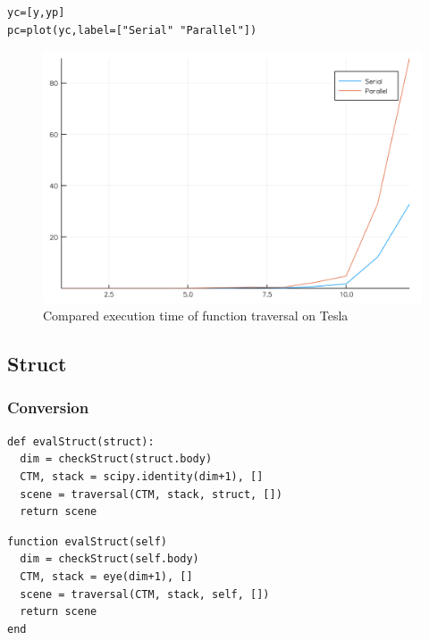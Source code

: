 \documentclass[a4paper,12pt]{article}
\begin{document}
\noindent {}
\begin{Verbatim}[fontsize=\footnotesize]
yc=[y,yp]
pc=plot(yc,label=["Serial" "Parallel"])
\end{Verbatim}

\begin{figure}[!h]
\centering
\includegraphics[scale=0.08]{comptraversal.png}
\caption{Compared execution time of function traversal on Tesla}
\end{figure}


\newpage
\subsection{Struct}\label{Struct}
\subsubsection{Conversion}

\noindent {}

\begin{multicols}{2}
\noindent {}
\begin{Verbatim}[fontsize=\scriptsize]
def evalStruct(struct):
  dim = checkStruct(struct.body)
  CTM, stack = scipy.identity(dim+1), []
  scene = traversal(CTM, stack, struct, [])
  return scene    
\end{Verbatim}
\columnbreak
{}
\begin{Verbatim}[fontsize=\scriptsize]
function evalStruct(self)
  dim = checkStruct(self.body)
  CTM, stack = eye(dim+1), []
  scene = traversal(CTM, stack, self, []) 
  return scene
end
\end{Verbatim}
\end{multicols}
\end{document}
